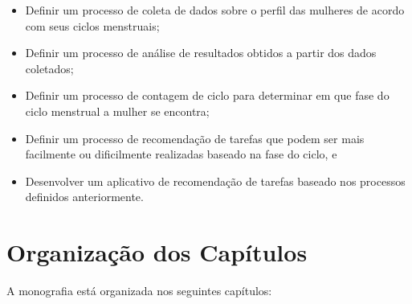 \begin{itemize}

        \item Definir um processo de coleta de dados sobre o perfil das mulheres de acordo com seus ciclos menstruais;
        
        \item Definir um processo de análise de resultados obtidos a partir dos dados coletados;

        \item Definir um processo de contagem de ciclo para determinar em que fase do ciclo menstrual a mulher se encontra;

        \item Definir um processo de recomendação de tarefas que podem ser mais facilmente ou dificilmente realizadas baseado na fase do ciclo, e

        \item Desenvolver um aplicativo de recomendação de tarefas baseado nos processos definidos anteriormente.

\end{itemize}

\section{Organização dos Capítulos}

A monografia está organizada nos seguintes capítulos:

